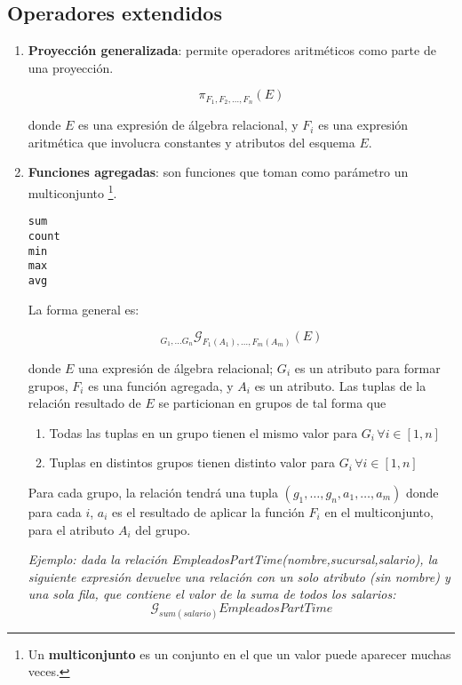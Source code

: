 \documentclass[a4paper, twoside]{article}
\begin{document}
\subsection{Operadores extendidos}
\begin{enumerate}
\item \textbf{Proyección generalizada}: permite operadores aritméticos como
parte de una proyección.


\[
\pi_{F_{1},F_{2},\dots,F_{n}}(E)
\]



donde $E$ es una expresión de álgebra relacional, y $F_{i}$ es una
expresión aritmética que involucra constantes y atributos del esquema
$E$.

\item \textbf{Funciones agregadas}: son funciones que toman como parámetro
un multiconjunto%
\footnote{Un \textbf{multiconjunto} es un conjunto en el que un valor puede
aparecer muchas veces.%
}.


\texttt{}
\begin{lstlisting}
sum
count
min
max
avg
\end{lstlisting}



La forma general es: 


\[
_{G_{1},\dots G_{n}}\mathcal{G}_{F_{1}(A_{1}),\dots,F_{m}(A_{m})}(E)
\]



donde $E$ una expresión de álgebra relacional; $G_{i}$ es un atributo
para formar grupos, $F_{i}$ es una función agregada, y $A_{i}$ es
un atributo. Las tuplas de la relación resultado de $E$ se particionan
en grupos de tal forma que
\begin{enumerate}
\item Todas las tuplas en un grupo tienen el mismo valor para $G_{i}\,\forall i\in[1,n]$
\item Tuplas en distintos grupos tienen distinto valor para $G_{i}\,\forall i\in[1,n]$
\end{enumerate}

Para cada grupo, la relación tendrá una tupla $(g_{1},\dots,g_{n},a_{1},\dots,a_{m})$
donde para cada $i$, $a_{i}$ es el resultado de aplicar la función
$F_{i}$ en el multiconjunto, para el atributo $A_{i}$ del grupo.


\emph{Ejemplo: dada la relación EmpleadosPartTime(nombre,sucursal,salario),
la siguiente expresión devuelve una relación con un solo atributo
(sin nombre) y una sola fila, que contiene el valor de la suma de
todos los salarios:} 
\[
\mathcal{G}_{sum(salario)}EmpleadosPartTime
\]




\end{enumerate}
\end{document}
